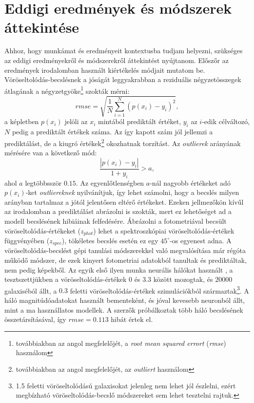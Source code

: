 \documentclass[12pt,letterpaper,oneside,openright]{book}
\begin{document}
\section{Eddigi eredmények és módszerek áttekintése}
Ahhoz, hogy munkámat és eredményeit kontextusba tudjam helyezni, szükséges az eddigi eredményekről és módszerekről áttekintést nyújtanom. Előszőr az eredmények irodalomban használt kiértékelés módjait mutatom be.
\newline\indent
Vöröseltolódás-becslésnek a jóságát leggyakrabban a reziduális
négyzetösszegek átlagának a négyzetgyöke\footnote{ továbbiakban az angol megfelelőjét, a \textit{root mean squared errort} (\textit{rmse}) használom} szokták mérni:
\begin{equation}
\textit{rmse} = \sqrt{\frac{1}{N}\sum^{N}_{i=1} (p(x_i)-y_i)^2},
\end{equation}
a képletben $p(x_i)$ jelöli az $x_i$ mintából prediktált értéket, $y_i$ az $i$-edik  célváltozó, $N$ pedig a prediktált értékek száma. Az így kapott szám jól jellemzi a prediktálást, de a kiugró értékek\footnote{továbbiakban az angol megfelelőjét, az \textit{outliert} használom} okozhatnak torzítást. Az \textit{outlierek} arányának mérésére van a következő mód:
\begin{equation}
\frac{|p(x_i)-y_i|}{1 + y_i} > a,
\end{equation}
 ahol $a$ legtöbbsször $0.15$. Az egyenlőtlenségben $a$-nál nagyobb értékeket adó $p(x_i)$-ket \textit{outliereknek} nyilvánítjuk, így lehet számolni, hogy a becslés milyen arányban tartalmaz a jótól jelentősen eltérő értékeket. Ezeken jellmezőkön kívűl az irodalomban a prediktálást abrázolni is szokták, mert ez lehetőséget ad a modell becslésének hibiáinak felfedésére. Ábrázolni a fotometriával becsült vöröseltolódás-értékeket ($z_{phot}$) lehet a spektroszkópiai vöröseltolódás-értékek függvényében ($z_{spec}$), tökéletes becslés esetén ez egy $45^{\circ}$-os egyenest adna. 
 \newline\indent
 A vöröseltolódás-becslést gépi tanulási módszerekkel való megvalósítása már régóta működő módszer, de ezek kinyert fotometriai adatokból tanultak és prediktáltak, nem pedig képekből. Az egyik első ilyen munka neurális hálókat használt \cite{ann1}, a tesztszettjükben a vöröseltolódás-értékek $0$ és $3.3$ között mozogtak, és $\num{20000}$ galaxiséból állt, a $0.3$ feletti vöröseltolódás-értékek szimulációkból származtak\footnote{1.5 feletti vöröseltolódású galaxisokat jelenleg nem lehet jól észlelni, ezért megbízható vöröseltolódás-becslő módszereket sem lehet tesztelni rajtuk.}. A háló magnitúdóadatokat használt bementeként, és  jóval kevesebb neuronból állt, mint a ma használlatos modellek. A szerzők próbálkoztak több háló becslésének összetársításával, így $\textit{rmse} = 0.113$ hibát értek el.
\end{document}
